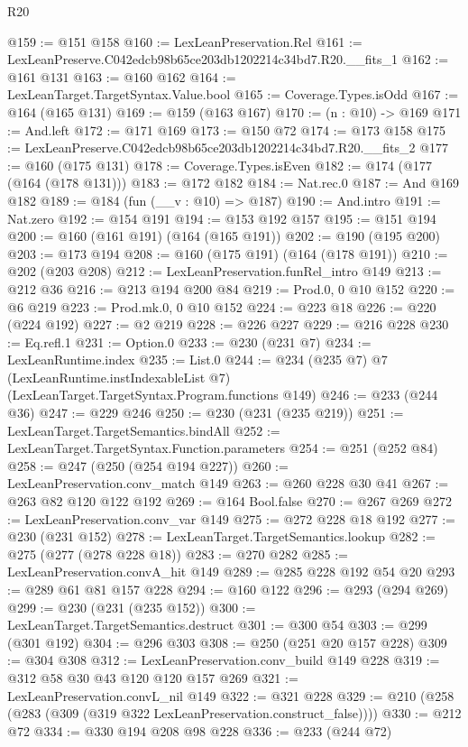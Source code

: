 \begin{lexlean}{R20}
\begin{coremodule}
@159 := @151 @158
@160 := LexLeanPreservation.Rel
@161 := LexLeanPreserve.C042edcb98b65ce203db1202214c34bd7.R20.__fits_1
@162 := @161 @131
@163 := @160 @162
@164 := LexLeanTarget.TargetSyntax.Value.bool
@165 := Coverage.Types.isOdd
@167 := @164 (@165 @131)
@169 := @159 (@163 @167)
@170 := (n : @10) -> @169
@171 := And.left
@172 := @171 @169
@173 := @150 @72
@174 := @173 @158
@175 := LexLeanPreserve.C042edcb98b65ce203db1202214c34bd7.R20.__fits_2
@177 := @160 (@175 @131)
@178 := Coverage.Types.isEven
@182 := @174 (@177 (@164 (@178 @131)))
@183 := @172 @182
@184 := Nat.rec.{0}
@187 := And @169 @182
@189 := @184 (fun (__v : @10) => @187)
@190 := And.intro
@191 := Nat.zero
@192 := @154 @191
@194 := @153 @192 @157
@195 := @151 @194
@200 := @160 (@161 @191) (@164 (@165 @191))
@202 := @190 (@195 @200)
@203 := @173 @194
@208 := @160 (@175 @191) (@164 (@178 @191))
@210 := @202 (@203 @208)
@212 := LexLeanPreservation.funRel_intro @149
@213 := @212 @36
@216 := @213 @194 @200 @84
@219 := Prod.{0, 0} @10 @152
@220 := @6 @219
@223 := Prod.mk.{0, 0} @10 @152
@224 := @223 @18
@226 := @220 (@224 @192)
@227 := @2 @219
@228 := @226 @227
@229 := @216 @228
@230 := Eq.refl.{1}
@231 := Option.{0}
@233 := @230 (@231 @7)
@234 := LexLeanRuntime.index
@235 := List.{0}
@244 := @234
    (@235 @7)
    @7
    (LexLeanRuntime.instIndexableList @7)
    (LexLeanTarget.TargetSyntax.Program.functions @149)
@246 := @233 (@244 @36)
@247 := @229 @246
@250 := @230 (@231 (@235 @219))
@251 := LexLeanTarget.TargetSemantics.bindAll
@252 := LexLeanTarget.TargetSyntax.Function.parameters
@254 := @251 (@252 @84)
@258 := @247 (@250 (@254 @194 @227))
@260 := LexLeanPreservation.conv_match @149
@263 := @260 @228 @30 @41
@267 := @263 @82 @120 @122 @192
@269 := @164 Bool.false
@270 := @267 @269
@272 := LexLeanPreservation.conv_var @149
@275 := @272 @228 @18 @192
@277 := @230 (@231 @152)
@278 := LexLeanTarget.TargetSemantics.lookup
@282 := @275 (@277 (@278 @228 @18))
@283 := @270 @282
@285 := LexLeanPreservation.convA_hit @149
@289 := @285 @228 @192 @54 @20
@293 := @289 @61 @81 @157 @228
@294 := @160 @122
@296 := @293 (@294 @269)
@299 := @230 (@231 (@235 @152))
@300 := LexLeanTarget.TargetSemantics.destruct
@301 := @300 @54
@303 := @299 (@301 @192)
@304 := @296 @303
@308 := @250 (@251 @20 @157 @228)
@309 := @304 @308
@312 := LexLeanPreservation.conv_build @149 @228
@319 := @312 @58 @30 @43 @120 @120 @157 @269
@321 := LexLeanPreservation.convL_nil @149
@322 := @321 @228
@329 := @210 (@258 (@283 (@309 (@319 @322 LexLeanPreservation.construct_false))))
@330 := @212 @72
@334 := @330 @194 @208 @98 @228
@336 := @233 (@244 @72)

\end{coremodule}
\end{lexlean}
